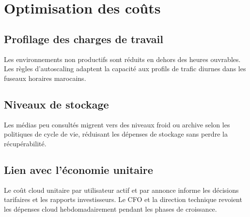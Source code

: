\section{Optimisation des coûts}

\subsection{Profilage des charges de travail}

Les environnements non productifs sont réduits en dehors des heures ouvrables. Les règles d'autoscaling adaptent la capacité aux profils de trafic diurnes dans les fuseaux horaires marocains.

\subsection{Niveaux de stockage}

Les médias peu consultés migrent vers des niveaux froid ou archive selon les politiques de cycle de vie, réduisant les dépenses de stockage sans perdre la récupérabilité.

\subsection{Lien avec l'économie unitaire}

Le coût cloud unitaire par utilisateur actif et par annonce informe les décisions tarifaires et les rapports investisseurs. Le CFO et la direction technique revoient les dépenses cloud hebdomadairement pendant les phases de croissance.


